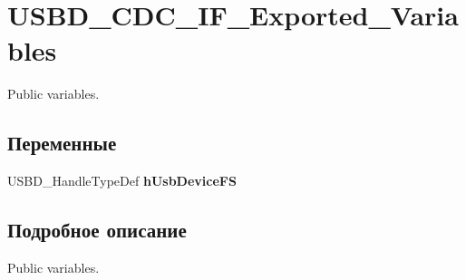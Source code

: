 \hypertarget{group___u_s_b_d___c_d_c___i_f___exported___variables}{
\section{USBD\_\-CDC\_\-IF\_\-Exported\_\-Variables}
\label{group___u_s_b_d___c_d_c___i_f___exported___variables}
}
Public variables.  


\subsection*{Переменные}
\begin{CompactItemize}
\item 
\hypertarget{group___u_s_b_d___c_d_c___i_f___exported___variables_gfe8a2d9e10b33d5e7906f9f04f95358e}{
USBD\_\-HandleTypeDef \textbf{hUsbDeviceFS}}
\label{group___u_s_b_d___c_d_c___i_f___exported___variables_gfe8a2d9e10b33d5e7906f9f04f95358e}

\end{CompactItemize}


\subsection{Подробное описание}
Public variables. 